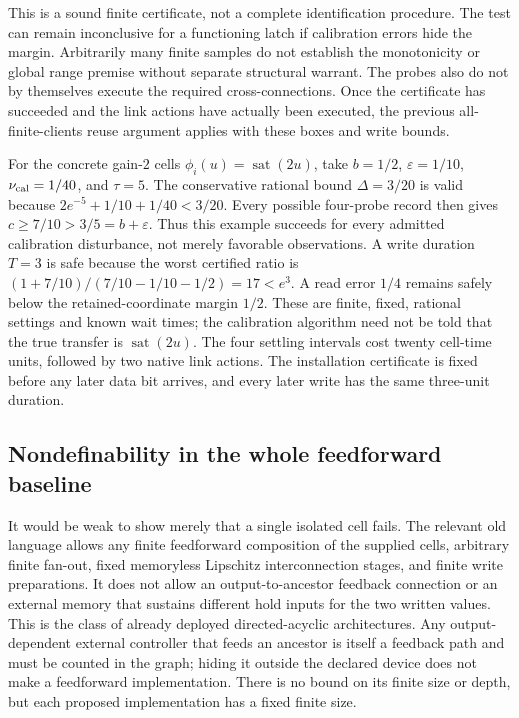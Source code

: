 \documentclass[11pt]{article}
\theoremstyle{definition}
\theoremstyle{remark}
\newcommand{\sat}{\operatorname{sat}}
\begin{document}
This is a sound finite certificate, not a complete identification procedure. The test can remain inconclusive for a functioning latch if calibration errors hide the margin. Arbitrarily many finite samples do not establish the monotonicity or global range premise without separate structural warrant. The probes also do not by themselves execute the required cross-connections. Once the certificate has succeeded and the link actions have actually been executed, the previous all-finite-clients reuse argument applies with these boxes and write bounds.

For the concrete gain-$2$ cells $\phi_i(u)=\sat(2u)$, take $b=1/2$, $\varepsilon=1/10$, $\nu_{\rm cal}=1/40$, and $\tau=5$. The conservative rational bound $\Delta=3/20$ is valid because $2e^{-5}+1/10+1/40<3/20$. Every possible four-probe record then gives $c\geq7/10>3/5=b+\varepsilon$. Thus this example succeeds for every admitted calibration disturbance, not merely favorable observations. A write duration $T=3$ is safe because the worst certified ratio is $(1+7/10)/(7/10-1/10-1/2)=17<e^3$. A read error $1/4$ remains safely below the retained-coordinate margin $1/2$. These are finite, fixed, rational settings and known wait times; the
calibration algorithm need not be told that the true transfer is
$\sat(2u)$. The four settling intervals cost twenty cell-time units,
followed by two native link actions. The installation certificate is
fixed before any later data bit arrives, and every later write has the
same three-unit duration.

\subsection{Nondefinability in the whole feedforward baseline}
It would be weak to show merely that a single isolated cell fails. The relevant old language allows any finite feedforward composition of the supplied cells, arbitrary finite fan-out, fixed memoryless Lipschitz interconnection stages, and finite write preparations. It does not allow an output-to-ancestor feedback connection or an external memory that sustains different hold inputs for the two written values. This is the class of already deployed directed-acyclic architectures. Any output-dependent external controller that feeds an ancestor is itself a feedback path and must be counted in the graph; hiding it outside the declared device does not make a feedforward implementation. There is no bound on its finite size or depth, but each proposed implementation has a fixed finite size.
\end{document}
